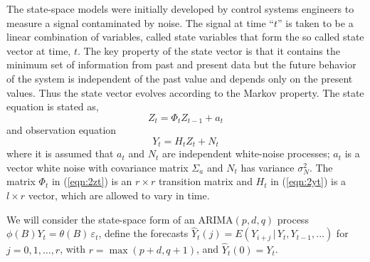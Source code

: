 The state-space models were initially developed by control systems engineers to measure a signal contaminated by noise. The signal at time ``$t$'' is taken to be a linear combination of variables, called state variables that form the so called state vector at time, $t$. The key property of the state vector is that it contains the minimum set of information from past and present data but the future behavior of the system is independent of the past value and depends only on the present values. Thus the state vector evolves according to the Markov property. The state equation is stated as,
	\begin{equation}\label{eqn:2zt}
	Z_t = \Phi_tZ_{t-1} + a_t
	\end{equation}
and observation equation
	\begin{equation}\label{eqn:2yt}
	Y_t = H_tZ_t + N_t
	\end{equation}
where it is assumed that $a_t$ and $N_t$ are independent white-noise processes; $a_t$ is a vector white noise with covariance matrix $\Sigma_a$ and $N_t$ has variance $\sigma_N^2$. The matrix $\Phi_t$ in (\ref{eqn:2zt}) is an $r \times r$ transition matrix and $H_t$ in (\ref{eqn:2yt}) is a $l \times r$ vector, which are allowed to vary in time.


We will consider the state-space form of an ARIMA$(p,d,q)$ process $\phi(B)Y_t = \theta(B)\,\varepsilon_t$, define the forecasts $\hat{Y}_t(j) = E(Y_{i+j}\,|\,Y_t,Y_{t-1},...)$ for $j= 0,1,\ldots,r$, with $r= \max(p+d,q+1)$, and $\hat{Y}_t(0) = Y_t$.



